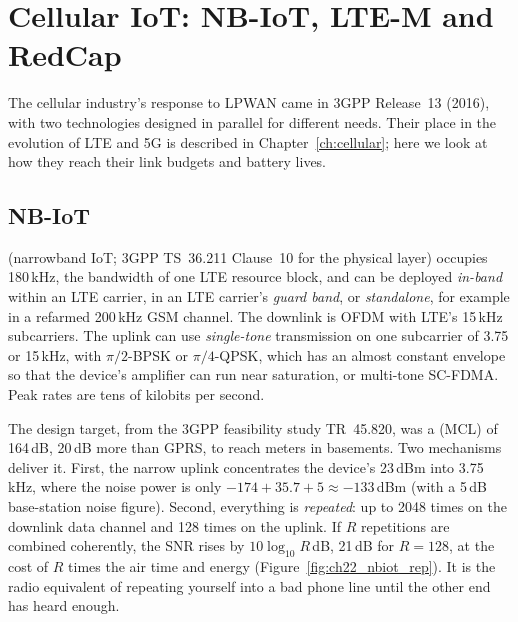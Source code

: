 \section{Cellular IoT: NB-IoT, LTE-M and RedCap}
\label{sec:ch22:cellular}

The cellular industry's response to LPWAN came in 3GPP Release~13 (2016), with two technologies
designed in parallel for different needs. Their place in the evolution of LTE and 5G is described in
Chapter~\ref{ch:cellular}; here we look at how they reach their link budgets and battery lives.

\subsection{NB-IoT}

 (narrowband IoT; 3GPP TS~36.211 Clause~10 for the physical layer) occupies 180\,kHz, the
bandwidth of one LTE resource block, and can be deployed \emph{in-band} within an LTE carrier, in an
LTE carrier's \emph{guard band}, or \emph{standalone}, for example in a refarmed 200\,kHz GSM channel.
The downlink is OFDM with LTE's 15\,kHz subcarriers. The uplink can use \emph{single-tone} transmission
on one subcarrier of 3.75 or 15\,kHz, with $\pi/2$-BPSK or $\pi/4$-QPSK, which has an almost constant
envelope so that the device's amplifier can run near saturation, or multi-tone SC-FDMA. Peak rates are
tens of kilobits per second.

The design target, from the 3GPP feasibility study TR~45.820, was a 
(MCL) of 164\,dB, 20\,dB more than GPRS, to reach meters in basements. Two mechanisms deliver it.
First, the narrow uplink concentrates the device's 23\,dBm into 3.75\,kHz, where the noise power is
only $-174+35.7+5\approx-133$\,dBm (with a 5\,dB base-station noise figure). Second, everything is
\emph{repeated}: up to 2048 times on the downlink data channel and 128 times on the uplink. If $R$
repetitions are combined coherently, the SNR rises by $10\log_{10}R$\,dB, 21\,dB for $R=128$, at the
cost of $R$ times the air time and energy (Figure~\ref{fig:ch22_nbiot_rep}). It is the
radio equivalent of repeating yourself into a bad phone line until the other end has heard enough.


